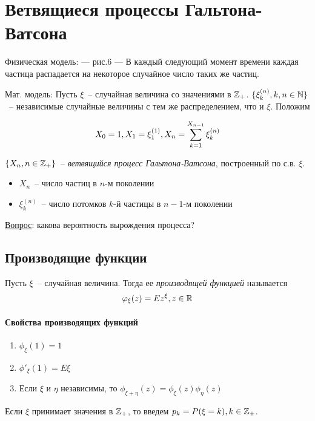 \section{Ветвящиеся процессы Гальтона-Ватсона}
Физическая модель: --- рис.6 ---
В каждый следующий момент времени каждая частица распадается на некоторое случайное число
таких же частиц.

Мат. модель:
Пусть $\xi$~-- случайная величина со значениями в $\mathbb{Z}_+$.
$\{\xi_k^{(n)}, k, n \in \mathbb{N}\}$~-- независимые случайные величины с тем
же распределением, что и $\xi$. Положим

$$X_0 = 1, X_1 = \xi_1^{(1)}, X_n = \sum\limits_{k=1}^{X_{n-1}} \xi_k^{(n)}$$

\begin{definition}
$\{X_n, n \in \mathbb{Z}_+\}$~-- \emph{ветвящийся процесс Гальтона-Ватсона}, построенный по с.в. $\xi$.
\end{definition}

\begin{itemize}
\item $X_n$~-- число частиц в $n$-м поколении
\item $\xi_k^{(n)}$~-- число потомков $k$-й частицы в $n-1$-м поколении
\end{itemize}

\underline{Вопрос}: какова вероятность вырождения процесса?

\subsection{Производящие функции}
\begin{definition}
Пусть $\xi$~-- случайная величина. Тогда ее \emph{производящей функцией} называется
$$\varphi_\xi(z) = Ez^\xi, z \in \mathbb{R}$$
\end{definition}

\paragraph{Свойства производящих функций}

\begin{enumerate}
\item $\phi_\xi(1) = 1$
\item $\phi'_\xi(1) = E\xi$
\item Если $\xi$ и $\eta$ независимы, то $\phi_{\xi + \eta}(z) = \phi_\xi(z) \phi_\eta(z)$
\end{enumerate}

Если $\xi$ принимает значения в $\mathbb{Z}_+$, то введем $p_k = P(\xi = k), k \in \mathbb{Z}_+$.

